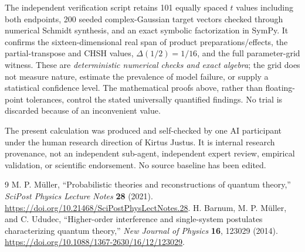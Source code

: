 \documentclass[11pt,letterpaper]{article}
\begin{document}
The independent verification script \texttt{}
retains 101 equally spaced $t$ values including both endpoints, 200 seeded
complex-Gaussian target vectors checked through numerical Schmidt synthesis,
and an exact symbolic factorization in SymPy. It confirms the sixteen-dimensional
real span of product preparations/effects, the partial-transpose and CHSH values,
$\Delta(1/2)=1/16$, and the full parameter-grid witness. These are
\emph{deterministic numerical checks and exact algebra}; the grid does not
measure nature, estimate the prevalence of model failure, or supply a
statistical confidence level. The mathematical proofs above, rather than
floating-point tolerances, control the stated universally quantified findings.
No trial is discarded because of an inconvenient value.

The present calculation was produced and self-checked by one AI participant
under the human research direction of Kirtus Justus. It is internal research
provenance, not an independent sub-agent, independent expert review, empirical
validation, or scientific endorsement. No source baseline has been edited.

\begin{thebibliography}{9}\small
{} M. P. M\"uller, ``Probabilistic theories and reconstructions of quantum theory,''
\emph{SciPost Physics Lecture Notes} \textbf{28} (2021).
\url{https://doi.org/10.21468/SciPostPhysLectNotes.28}.
 H. Barnum, M. P. M\"uller, and C. Ududec,
``Higher-order interference and single-system postulates characterizing quantum theory,''
\emph{New Journal of Physics} \textbf{16}, 123029 (2014).
\url{https://doi.org/10.1088/1367-2630/16/12/123029}.
\end{thebibliography}
\end{document}
